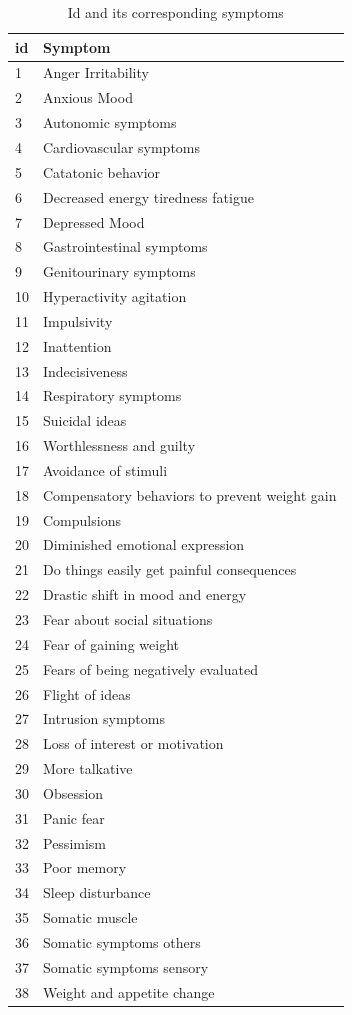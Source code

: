 \begin{table}[th]
    \small
    \centering
    \begin{tabular}{m{0.4cm}m{6cm}}
    \hline
    id & Symptom  \\
    \hline
    1&Anger Irritability	\\
    2&Anxious Mood 	\\
    3&Autonomic symptoms	\\
    4&Cardiovascular symptoms		\\
    5&Catatonic behavior\\
    6&Decreased energy tiredness fatigue	\\
    7&Depressed Mood\\
    8&Gastrointestinal symptoms	\\
    9&Genitourinary symptoms	\\
    10&Hyperactivity agitation	\\
    11&Impulsivity		\\
    12&Inattention	\\
    13&Indecisiveness	\\
    14&Respiratory symptoms\\
    15&Suicidal ideas	\\
    16&Worthlessness and guilty	\\
    17&Avoidance of stimuli	\\
    18&Compensatory behaviors to prevent weight gain	\\
    19&Compulsions		\\
    20&Diminished emotional expression		\\
    21&Do things easily get painful consequences	\\
    22&Drastic shift in mood and energy	\\
    23&Fear about social situations	\\
    24&Fear of gaining weight	\\
    25&Fears of being negatively evaluated	\\
    26&Flight of ideas	\\
    27&Intrusion symptoms	\\
    28&Loss of interest or motivation	\\
    29&More talkative\\
    30&Obsession	\\
    31&Panic fear	\\
    32&Pessimism	\\
    33&Poor memory	\\
    34&Sleep disturbance	\\
    35&Somatic muscle		\\
    36&Somatic symptoms others		\\
    37&Somatic symptoms sensory	\\
    38&Weight and appetite change	\\
    \hline
    \end{tabular}
    \caption{Id and its corresponding symptoms}
    \label{tab:symp_id}
\end{table}

